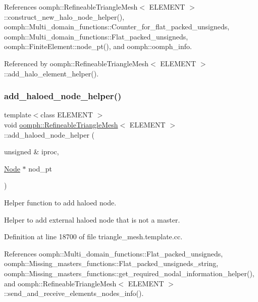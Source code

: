 References oomph\+::\+Refineable\+Triangle\+Mesh$<$ E\+L\+E\+M\+E\+N\+T $>$\+::construct\+\_\+new\+\_\+halo\+\_\+node\+\_\+helper(), oomph\+::\+Multi\+\_\+domain\+\_\+functions\+::\+Counter\+\_\+for\+\_\+flat\+\_\+packed\+\_\+unsigneds, oomph\+::\+Multi\+\_\+domain\+\_\+functions\+::\+Flat\+\_\+packed\+\_\+unsigneds, oomph\+::\+Finite\+Element\+::node\+\_\+pt(), and oomph\+::oomph\+\_\+info.



Referenced by oomph\+::\+Refineable\+Triangle\+Mesh$<$ E\+L\+E\+M\+E\+N\+T $>$\+::add\+\_\+halo\+\_\+element\+\_\+helper().

\mbox{\label{classoomph_1_1RefineableTriangleMesh_abe41b8b8aa2cc51d507c5e17957faf38}} 
\subsubsection{\texorpdfstring{add\+\_\+haloed\+\_\+node\+\_\+helper()}{add\_haloed\_node\_helper()}}
{\footnotesize\ttfamily template$<$class E\+L\+E\+M\+E\+NT $>$ \\
void \hyperlink{classoomph_1_1RefineableTriangleMesh}{oomph\+::\+Refineable\+Triangle\+Mesh}$<$ E\+L\+E\+M\+E\+NT $>$\+::add\+\_\+haloed\+\_\+node\+\_\+helper (\begin{DoxyParamCaption}\item[{unsigned \&}]{iproc,  }\item[{\hyperlink{classoomph_1_1Node}{Node} $\ast$}]{nod\+\_\+pt }\end{DoxyParamCaption})\hspace{0.3cm}{\ttfamily [protected]}}



Helper function to add haloed node. 

Helper to add external haloed node that is not a master. 

Definition at line 18700 of file triangle\+\_\+mesh.\+template.\+cc.



References oomph\+::\+Multi\+\_\+domain\+\_\+functions\+::\+Flat\+\_\+packed\+\_\+unsigneds, oomph\+::\+Missing\+\_\+masters\+\_\+functions\+::\+Flat\+\_\+packed\+\_\+unsigneds\+\_\+string, oomph\+::\+Missing\+\_\+masters\+\_\+functions\+::get\+\_\+required\+\_\+nodal\+\_\+information\+\_\+helper(), and oomph\+::\+Refineable\+Triangle\+Mesh$<$ E\+L\+E\+M\+E\+N\+T $>$\+::send\+\_\+and\+\_\+receive\+\_\+elements\+\_\+nodes\+\_\+info().



